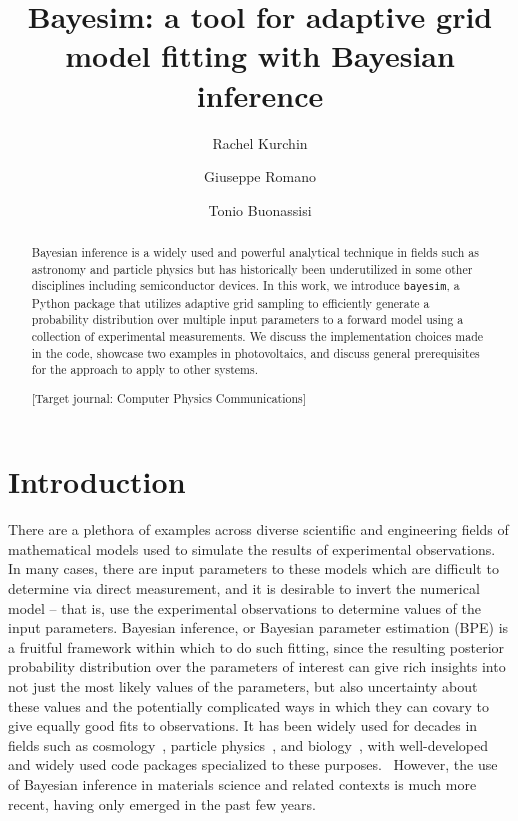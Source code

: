 \documentclass[aps,prl,amsmath,amssymb,superscriptaddress,notitlepage,groupedaddress]{revtex4-1}
\begin{document}
\title{Bayesim: a tool for adaptive grid model fitting with Bayesian inference}

\author{Rachel Kurchin}
\author{Giuseppe Romano}
\author{Tonio Buonassisi}

\begin{abstract}
  Bayesian inference is a widely used and powerful analytical technique in fields such as astronomy and particle physics but has historically been underutilized in some other disciplines including semiconductor devices. In this work, we introduce \texttt{bayesim}, a Python package that utilizes adaptive grid sampling to efficiently generate a probability distribution over multiple input parameters to a forward model using a collection of experimental measurements. We discuss the implementation choices made in the code, showcase two examples in photovoltaics, and discuss general prerequisites for the approach to apply to other systems.

  [Target journal: Computer Physics Communications]
\end{abstract}

\maketitle

\section*{Introduction}
  There are a plethora of examples across diverse scientific and engineering fields of mathematical models used to simulate the results of experimental observations. In many cases, there are input parameters to these models which are difficult to determine via direct measurement, and it is desirable to invert the numerical model -- that is, use the experimental observations to determine values of the input parameters. Bayesian inference, or Bayesian parameter estimation (BPE) is a fruitful framework within which to do such fitting, since the resulting posterior probability distribution over the parameters of interest can give rich insights into not just the most likely values of the parameters, but also uncertainty about these values and the potentially complicated ways in which they can covary to give equally good fits to observations. It has been widely used for decades in fields such as cosmology~\cite{cosmobayesreview}, particle physics~\cite{particlebayes, higgsbayes}, and biology~\cite{evobiobayes, sysbiobayes}, with well-developed and widely used code packages specialized to these purposes.~\cite{multinest, biobayescode} However, the use of Bayesian inference in materials science and related contexts is much more recent, having only emerged in the past few years.~\cite{lookman, combo, SnSJoule}
\end{document}
